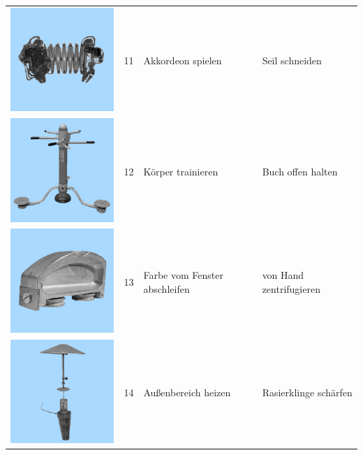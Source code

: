 \documentclass[
  english,
  man,floatsintext]{apa7}
\begin{document}
\begin{center}
\begin{ThreePartTable}
\begin{longtable}{llll}
\includegraphics[valign=c, scale=0.19]{../materials/unfamiliar/11.png} & 11 & Akkordeon spielen & Seil schneiden\\
\includegraphics[valign=c, scale=0.19]{../materials/unfamiliar/12.png} & 12 & Körper trainieren & Buch offen halten\\
\includegraphics[valign=c, scale=0.19]{../materials/unfamiliar/13.png} & 13 & Farbe vom Fenster abschleifen & von Hand zentrifugieren\\
\includegraphics[valign=c, scale=0.19]{../materials/unfamiliar/14.png} & 14 & Außenbereich heizen & Rasierklinge schärfen\\

\end{longtable}
\end{ThreePartTable}
\end{center}
\end{document}
